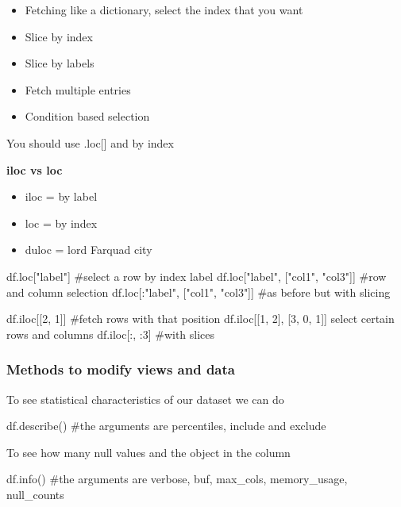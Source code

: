 \begin{itemize}
    \item Fetching like a dictionary, select the index that you want
    \item Slice by index
    \item Slice by labels
    \item Fetch multiple entries
    \item Condition based selection
\end{itemize}

\vspace{10pt}

You should use .loc[] and by index

\vspace{10pt}

\textbf{iloc vs loc}

\begin{itemize}
    \item iloc = by label
    \item loc = by index
    \item duloc = lord Farquad city
\end{itemize}


\begin{pythoncode}
    df.loc["label"] #select a row by index label
    df.loc["label", ["col1", "col3"]] #row and column selection
    df.loc[:"label", ["col1", "col3"]] #as before but with slicing

    df.iloc[[2, 1]] #fetch rows with that position
    df.iloc[[1, 2], [3, 0, 1]] select certain rows and columns
    df.iloc[:, :3] #with slices
\end{pythoncode}

\subsubsection{Methods to modify views and data}

To see statistical characteristics of our dataset we can do

\begin{pythoncode}
    df.describe() #the arguments are percentiles, include and exclude
\end{pythoncode}


To see how many null values and the object in the column

\begin{pythoncode}
    df.info() #the arguments are verbose, buf, max_cols, memory_usage, null_counts
\end{pythoncode}

